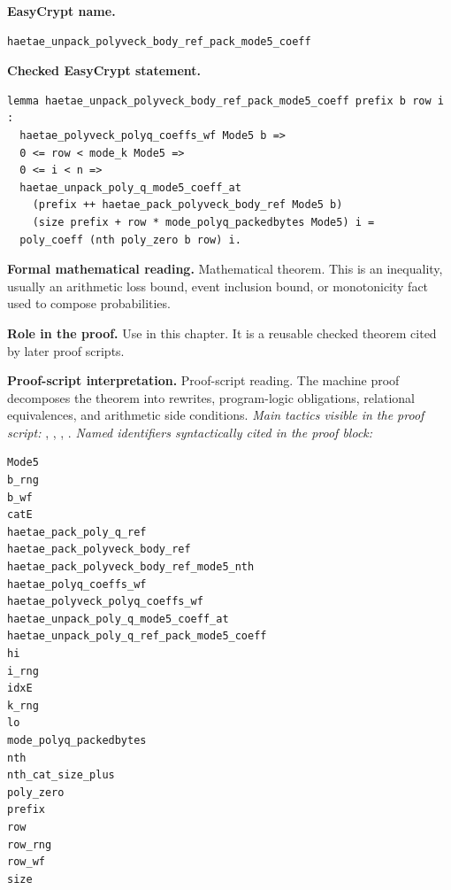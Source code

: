 \begin{formaltheorem}
\noindent\textbf{EasyCrypt name.}
\begin{lstlisting}[language=EasyCrypt,basicstyle=\ttfamily\scriptsize]
haetae_unpack_polyveck_body_ref_pack_mode5_coeff
\end{lstlisting}
\noindent\textbf{Checked EasyCrypt statement.}
\begin{lstlisting}[language=EasyCrypt,basicstyle=\ttfamily\scriptsize]
lemma haetae_unpack_polyveck_body_ref_pack_mode5_coeff prefix b row i :
  haetae_polyveck_polyq_coeffs_wf Mode5 b =>
  0 <= row < mode_k Mode5 =>
  0 <= i < n =>
  haetae_unpack_poly_q_mode5_coeff_at
    (prefix ++ haetae_pack_polyveck_body_ref Mode5 b)
    (size prefix + row * mode_polyq_packedbytes Mode5) i =
  poly_coeff (nth poly_zero b row) i.
\end{lstlisting}
\noindent\textbf{Formal mathematical reading.}
Mathematical theorem. This is an inequality, usually an arithmetic loss bound, event inclusion bound, or monotonicity fact used to compose probabilities.

\noindent\textbf{Role in the proof.}
Use in this chapter. It is a reusable checked theorem cited by later proof scripts.

\noindent\textbf{Proof-script interpretation.}
Proof-script reading. The machine proof decomposes the theorem into rewrites, program-logic obligations, relational equivalences, and arithmetic side conditions.
\emph{Main tactics visible in the proof script:} , , , .
\emph{Named identifiers syntactically cited in the proof block:}
\begin{lstlisting}[language=EasyCrypt,basicstyle=\ttfamily\scriptsize]
Mode5
b_rng
b_wf
catE
haetae_pack_poly_q_ref
haetae_pack_polyveck_body_ref
haetae_pack_polyveck_body_ref_mode5_nth
haetae_polyq_coeffs_wf
haetae_polyveck_polyq_coeffs_wf
haetae_unpack_poly_q_mode5_coeff_at
haetae_unpack_poly_q_ref_pack_mode5_coeff
hi
i_rng
idxE
k_rng
lo
mode_polyq_packedbytes
nth
nth_cat_size_plus
poly_zero
prefix
row
row_rng
row_wf
size
\end{lstlisting}

\end{formaltheorem}

